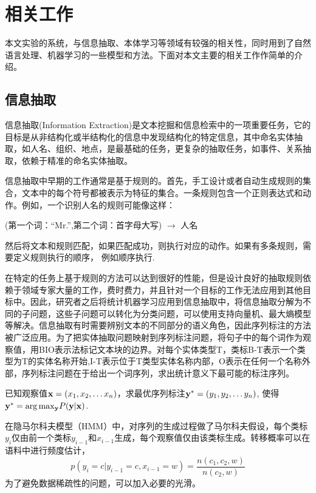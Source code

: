 \chapter{相关工作}
本文实验的系统，与信息抽取、本体学习等领域有较强的相关性，同时用到了自然语言处理、机器学习的一些模型和方法。下面对本文主要的相关工作作简单的介绍。
\section{信息抽取}

信息抽取(Information Extraction)是文本挖掘和信息检索中的一项重要任务，它的目标是从非结构化或半结构化的信息中发现结构化的特定信息，其中命名实体抽取，如人名、组织、地点，是最基础的任务，更复杂的抽取任务，如事件、关系抽取，依赖于精准的命名实体抽取。

信息抽取中早期的工作通常是基于规则的\cite{ciravegna2001adaptive}。首先，手工设计或者自动生成规则的集合，文本中的每个符号都被表示为特征的集合。一条规则包含一个正则表达式和动作。例如，一个识别人名的规则可能像这样：
\begin{center}
	(第一个词：``Mr.'',第二个词：首字母大写) $\rightarrow$ 人名
\end{center}
然后将文本和规则匹配，如果匹配成功，则执行对应的动作。如果有多条规则，需要定义规则执行的顺序，
例如顺序执行.

在特定的任务上基于规则的方法可以达到很好的性能，但是设计良好的抽取规则依赖于领域专家大量的工作，费时费力，并且针对一个目标的工作无法应用到其他目标中。因此，研究者之后将统计机器学习应用到信息抽取中，将信息抽取分解为不同的子问题，这些子问题可以转化为分类问题，可以使用支持向量机、最大熵模型等解决。信息抽取有时需要辨别文本的不同部分的语义角色，因此序列标注的方法被广泛应用。为了把实体抽取问题映射到序列标注问题，将句子中的每个词作为观察值，用BIO表示法标记文本块的边界。对每个实体类型T，类标B-T表示一个类型为T的实体名称开始,I-T表示位于T类型实体名称内部，O表示在任何一个名称外部，序列标注问题在于给出一个词序列，求出统计意义下最可能的标注序列。

\begin{problem}[序列标注]
已知观察值${\bf{x}} = ({x_1},{x_2}, \ldots {x_n})$，求最优序列标注${\bf{y^*}} = ({y_1},{y_2}, \ldots {y_n})$, 使得${{\bf{y}}^*} = \arg {\max _{\bf{y}}}P({\bf{y}}|{\bf{x}})$.
\end{problem}
在隐马尔科夫模型（HMM）中，对序列的生成过程做了马尔科夫假设，每个类标$y_i$仅由前一个类标$y_{i-1}$和$x_{i-1}$生成，每个观察值仅由该类标生成。转移概率可以在语料中进行频度估计，
\[
p(y_i=c|y_{i-1} = c, x_{i-1}=w) = \frac{n(c_1, c_2, w)}{n(c_2, w)}
\]
为了避免数据稀疏性的问题，可以加入必要的光滑。

